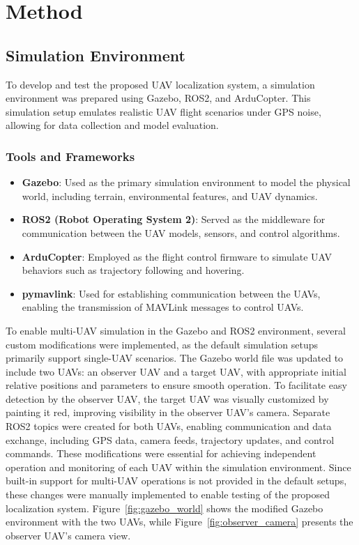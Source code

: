 \chapter{Method}


\section{Simulation Environment}

To develop and test the proposed UAV localization system, a simulation environment was prepared using Gazebo, ROS2, and ArduCopter. This simulation setup emulates realistic UAV flight scenarios under GPS noise, allowing for data collection and model evaluation.

\subsection{Tools and Frameworks}
\begin{itemize}
    \item \textbf{Gazebo}: Used as the primary simulation environment to model the physical world, including terrain, environmental features, and UAV dynamics.
    \item \textbf{ROS2 (Robot Operating System 2)}: Served as the middleware for communication between the UAV models, sensors, and control algorithms.
    \item \textbf{ArduCopter}: Employed as the flight control firmware to simulate UAV behaviors such as trajectory following and hovering.
    \item \textbf{pymavlink}: Used for establishing communication between the UAVs, enabling the transmission of MAVLink messages to control UAVs.
\end{itemize}
To enable multi-UAV simulation in the Gazebo and ROS2 environment, several custom modifications were implemented, as the default simulation setups primarily support single-UAV scenarios. The Gazebo world file was updated to include two UAVs: an observer UAV and a target UAV, with appropriate initial relative positions and parameters to ensure smooth operation. To facilitate easy detection by the observer UAV, the target UAV was visually customized by painting it red, improving visibility in the observer UAV's camera. Separate ROS2 topics were created for both UAVs, enabling communication and data exchange, including GPS data, camera feeds, trajectory updates, and control commands. These modifications were essential for achieving independent operation and monitoring of each UAV within the simulation environment. Since built-in support for multi-UAV operations is not provided in the default setups, these changes were manually implemented to enable testing of the proposed localization system. Figure~\ref{fig:gazebo_world} shows the modified Gazebo environment with the two UAVs, while Figure~\ref{fig:observer_camera} presents the observer UAV’s camera view.
